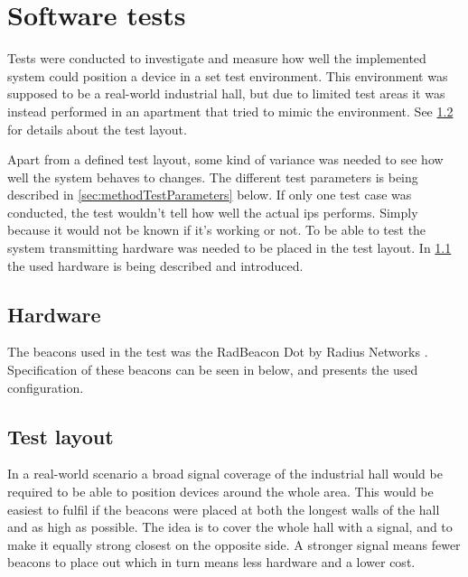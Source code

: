 \section{Software tests}\label{sec:methodSoftwareTests}
Tests were conducted to investigate and measure how well the implemented system could position a device in a set test environment.
This environment was supposed to be a real-world industrial hall, but due to limited test areas it was instead performed in an apartment that tried to mimic the environment.
See \cref{sec:methodTestLayout} for details about the test layout.

\bigskip

Apart from a defined test layout, some kind of variance was needed to see how well the system behaves to changes. The different test parameters is being described in \cref{sec:methodTestParameters} below.
If only one test case was conducted, the test wouldn't tell how well the actual \acrshort{ips} performs.
Simply because it would not be known if it's working or not.
To be able to test the system transmitting hardware was needed to be placed in the test layout.
In \cref{sec:methodTestHardware} the used hardware is being described and introduced.


\subsection{Hardware}\label{sec:methodTestHardware}
The beacons used in the test was the RadBeacon Dot by Radius Networks \cite{RadBeaconDotDatasheet}.
Specification of these beacons can be seen in  below, and  presents the used configuration.




\subsection{Test layout}\label{sec:methodTestLayout}
In a real-world scenario a broad signal coverage of the industrial hall would be required to be able to position devices around the whole area.
This would be easiest to fulfil if the beacons were placed at both the longest walls of the hall and as high as possible.
The idea is to cover the whole hall with a signal, and to make it equally strong closest on the opposite side.
A stronger signal means fewer beacons to place out which in turn means less hardware and a lower cost.

